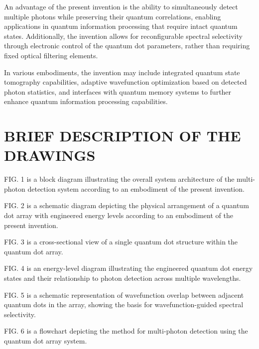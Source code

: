 \documentclass[12pt,letterpaper]{article}
\begin{document}
An advantage of the present invention is the ability to simultaneously detect multiple photons while preserving their quantum correlations, enabling applications in quantum information processing that require intact quantum states. Additionally, the invention allows for reconfigurable spectral selectivity through electronic control of the quantum dot parameters, rather than requiring fixed optical filtering elements.

In various embodiments, the invention may include integrated quantum state tomography capabilities, adaptive wavefunction optimization based on detected photon statistics, and interfaces with quantum memory systems to further enhance quantum information processing capabilities.

\section*{BRIEF DESCRIPTION OF THE DRAWINGS}


FIG. 1 is a block diagram illustrating the overall system architecture of the multi-photon detection system according to an embodiment of the present invention.

FIG. 2 is a schematic diagram depicting the physical arrangement of a quantum dot array with engineered energy levels according to an embodiment of the present invention.

FIG. 3 is a cross-sectional view of a single quantum dot structure within the quantum dot array.

FIG. 4 is an energy-level diagram illustrating the engineered quantum dot energy states and their relationship to photon detection across multiple wavelengths.

FIG. 5 is a schematic representation of wavefunction overlap between adjacent quantum dots in the array, showing the basis for wavefunction-guided spectral selectivity.

FIG. 6 is a flowchart depicting the method for multi-photon detection using the quantum dot array system.
\end{document}

